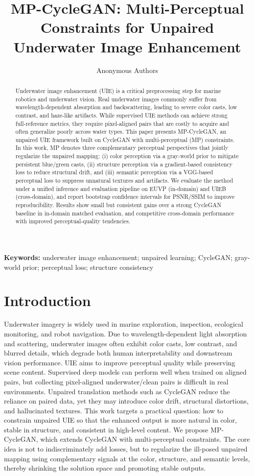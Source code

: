 \documentclass[11pt,a4paper]{article}
\title{MP-CycleGAN: Multi-Perceptual Constraints for Unpaired Underwater Image Enhancement}
\author{Anonymous Authors}
\date{}
\begin{document}
\maketitle
\begin{abstract}
Underwater image enhancement (UIE) is a critical preprocessing step for marine robotics and underwater vision. Real underwater images commonly suffer from wavelength-dependent absorption and backscattering, leading to severe color casts, low contrast, and haze-like artifacts. While supervised UIE methods can achieve strong full-reference metrics, they require pixel-aligned pairs that are costly to acquire and often generalize poorly across water types. This paper presents MP-CycleGAN, an unpaired UIE framework built on CycleGAN with multi-perceptual (MP) constraints. In this work, MP denotes three complementary perceptual perspectives that jointly regularize the unpaired mapping: (i) color perception via a gray-world prior to mitigate persistent blue/green casts, (ii) structure perception via a gradient-based consistency loss to reduce structural drift, and (iii) semantic perception via a VGG-based perceptual loss to suppress unnatural textures and artifacts. We evaluate the method under a unified inference and evaluation pipeline on EUVP (in-domain) and UIEB (cross-domain), and report bootstrap confidence intervals for PSNR/SSIM to improve reproducibility. Results show small but consistent gains over a strong CycleGAN baseline in in-domain matched evaluation, and competitive cross-domain performance with improved perceptual-quality tendencies.
\end{abstract}
\textbf{Keywords:} underwater image enhancement; unpaired learning; CycleGAN; gray-world prior; perceptual loss; structure consistency
\section{Introduction}
Underwater imagery is widely used in marine exploration, inspection, ecological monitoring, and robot navigation. Due to wavelength-dependent light absorption and scattering, underwater images often exhibit color casts, low contrast, and blurred details, which degrade both human interpretability and downstream vision performance. UIE aims to improve perceptual quality while preserving scene content.
Supervised deep models can perform well when trained on aligned pairs, but collecting pixel-aligned underwater/clean pairs is difficult in real environments. Unpaired translation methods such as CycleGAN reduce the reliance on paired data, yet they may introduce color drift, structural distortions, and hallucinated textures. This work targets a practical question: how to constrain unpaired UIE so that the enhanced output is more natural in color, stable in structure, and consistent in high-level content.
We propose MP-CycleGAN, which extends CycleGAN with multi-perceptual constraints. The core idea is not to indiscriminately add losses, but to regularize the ill-posed unpaired mapping using complementary signals at the color, structure, and semantic levels, thereby shrinking the solution space and promoting stable outputs.
\end{document}
